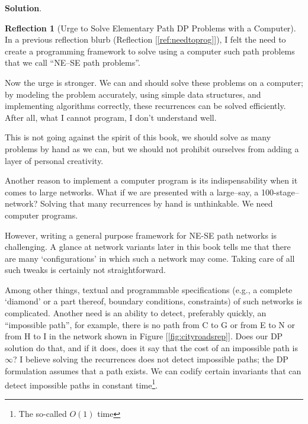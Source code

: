 \documentclass[english,notitlepage,smartquotes]{hgbreport}
\theoremstyle{definition}
\theoremstyle{definition}
\theoremstyle{remark}
\theoremstyle{definition}
\theoremstyle{plain}
\theoremstyle{definition}
\newtheorem{reflection}{Reflection}
\begin{document}
\textbf{Solution}.
\begin{reflection}[Urge to Solve Elementary Path DP Problems with a Computer]
In a previous reflection blurb (Reflection [\ref{ref:needtoprog}]), I felt the need to create a programming framework to solve using a computer such path problems that we call ``NE--SE path problems''. 

Now the urge is stronger. We can and should solve these problems on a computer; by modeling the problem accurately, using simple data structures, and implementing algorithms correctly, these recurrences can be solved efficiently. After all, what I cannot program, I don't understand well. 

This is not going against the spirit of this book, we should solve as many problems by hand as we can, but we should not prohibit ourselves from adding a layer of personal creativity.

Another reason to implement a computer program is its indispensability when it comes to large networks. What if we are presented with a large--say, a 100-stage--network? Solving that many recurrences by hand is unthinkable. We need computer programs.

However, writing a general purpose framework for NE-SE path networks is challenging. A glance at network variants later in this book tells me that there are many `configurations' in which such a network may come. Taking care of all such tweaks is certainly not straightforward. 

Among other things, textual and programmable specifications (e.g., a complete `diamond' or a part thereof, boundary conditions, constraints) of such networks is complicated. Another need is an ability to detect, preferably quickly, an ``impossible path'', for example, there is no path from C to G or from E to N or from H to I in the network shown in Figure [\ref{fig:cityroadsrep}]. Does our DP solution do that, and if it does, does it say that the cost of an impossible path is $\infty$? I believe solving the recurrences does not detect impossible paths; the DP formulation assumes that a path exists. We can codify certain invariants that can detect impossible paths in constant time\footnote{The so-called $O(1)$ time}.
\end{reflection}
\MakeBibliography[nosplit]

\end{document}
